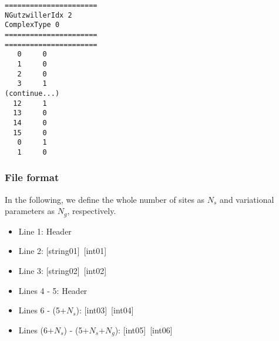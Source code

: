 \begin{minipage}{12.5cm}
\begin{screen}
\begin{verbatim}
======================
NGutzwillerIdx 2  
ComplexType 0
====================== 
====================== 
   0     0
   1     0
   2     0
   3     1
(continue...)
  12     1
  13     0
  14     0
  15     0
   0     1
   1     0
\end{verbatim}
\end{screen}
\end{minipage}

\subsubsection{File format}
In the following, we define the whole number of sites as $N_s$ and variational parameters as $N_g$, respectively.  
 \begin{itemize}
   \item  Line 1: Header
   \item  Line 2: [string01]~[int01]
   \item  Line 3: [string02]~[int02]
   \item  Lines 4 - 5:  Header
   \item  Lines 6 - (5+$N_s$): [int03]~[int04]
   \item  Lines (6+$N_s$) - (5+$N_s$+$N_g$): [int05]~[int06]
  \end{itemize}
